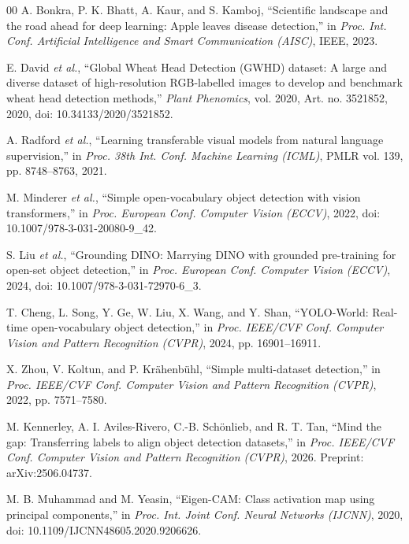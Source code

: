 \documentclass[conference]{IEEEtran}
\begin{document}
\begin{thebibliography}{00}
 A. Bonkra, P. K. Bhatt, A. Kaur, and S. Kamboj, ``Scientific landscape and the road ahead for deep learning: Apple leaves disease detection,'' in \textit{Proc. Int. Conf. Artificial Intelligence and Smart Communication (AISC)}, IEEE, 2023.

 E. David \textit{et al.}, ``Global Wheat Head Detection (GWHD) dataset: A large and diverse dataset of high-resolution RGB-labelled images to develop and benchmark wheat head detection methods,'' \textit{Plant Phenomics}, vol. 2020, Art. no. 3521852, 2020, doi: 10.34133/2020/3521852.

 A. Radford \textit{et al.}, ``Learning transferable visual models from natural language supervision,'' in \textit{Proc. 38th Int. Conf. Machine Learning (ICML)}, PMLR vol. 139, pp. 8748--8763, 2021.

 M. Minderer \textit{et al.}, ``Simple open-vocabulary object detection with vision transformers,'' in \textit{Proc. European Conf. Computer Vision (ECCV)}, 2022, doi: 10.1007/978-3-031-20080-9\_42.

 S. Liu \textit{et al.}, ``Grounding DINO: Marrying DINO with grounded pre-training for open-set object detection,'' in \textit{Proc. European Conf. Computer Vision (ECCV)}, 2024, doi: 10.1007/978-3-031-72970-6\_3.

 T. Cheng, L. Song, Y. Ge, W. Liu, X. Wang, and Y. Shan, ``YOLO-World: Real-time open-vocabulary object detection,'' in \textit{Proc. IEEE/CVF Conf. Computer Vision and Pattern Recognition (CVPR)}, 2024, pp. 16901--16911.

 X. Zhou, V. Koltun, and P. Kr\"{a}henb\"{u}hl, ``Simple multi-dataset detection,'' in \textit{Proc. IEEE/CVF Conf. Computer Vision and Pattern Recognition (CVPR)}, 2022, pp. 7571--7580.

 M. Kennerley, A. I. Aviles-Rivero, C.-B. Sch\"{o}nlieb, and R. T. Tan, ``Mind the gap: Transferring labels to align object detection datasets,'' in \textit{Proc. IEEE/CVF Conf. Computer Vision and Pattern Recognition (CVPR)}, 2026. Preprint: arXiv:2506.04737.

 M. B. Muhammad and M. Yeasin, ``Eigen-CAM: Class activation map using principal components,'' in \textit{Proc. Int. Joint Conf. Neural Networks (IJCNN)}, 2020, doi: 10.1109/IJCNN48605.2020.9206626.


\end{thebibliography}
\end{document}
